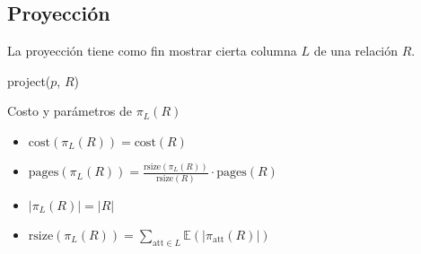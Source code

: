 \subsection{Proyección}
La proyección tiene como fin mostrar cierta columna $L$ de una relación $R$.
\begin{paracol}{2}
  \begin{algorithm}
    \caption{project($p$, $R$)}
    \DontPrintSemicolon
  
  
  \end{algorithm}

  \switchcolumn

  Costo y parámetros de $\pi_L(R)$
  \begin{itemize}
    \item $\text{cost}(\pi_L(R)) = \text{cost}(R)$
    \item $\text{pages}(\pi_L(R)) = \frac{\text{rsize}(\pi_L(R))}{\text{rsize}(R)} \cdot \text{pages}(R)$
    \item $|\pi_L(R)| = |R|$
    \item $\text{rsize}(\pi_L(R)) = \sum_{\text{att} \in L} \mathbb{E}(|\pi_{\text{att}}(R)|)$
  \end{itemize}
\end{paracol}

\pagebreak

